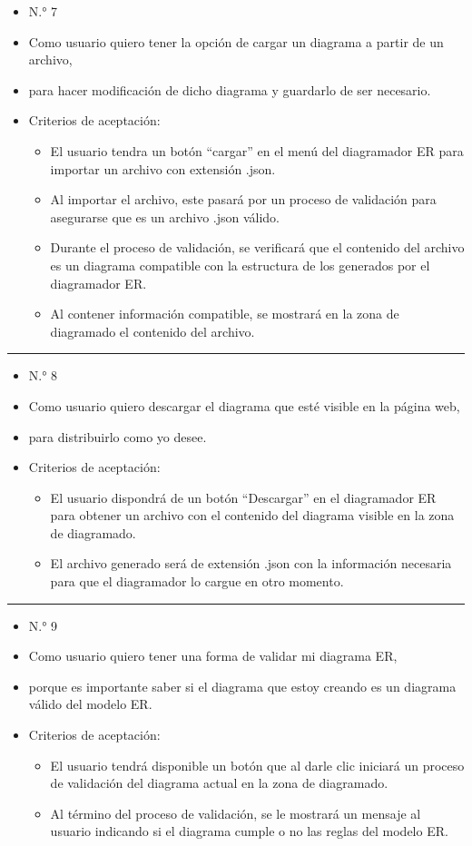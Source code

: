 \begin{itemize}
	\item N.° 7
	\item Como usuario quiero tener la opción de cargar un diagrama a partir de un archivo,
	\item para hacer modificación de dicho diagrama y guardarlo de ser necesario.
	\item Criterios de aceptación:
	\begin{itemize}
		\item El usuario tendra un botón ``cargar'' en el menú del diagramador ER para importar un archivo con extensión .json.
		\item Al importar el archivo, este pasará por un proceso de validación para asegurarse que es un archivo .json válido.
		\item Durante el proceso de validación, se verificará que el contenido del archivo es un diagrama compatible con la estructura de los generados por el diagramador ER.
		\item Al contener información compatible, se mostrará en la zona de diagramado el contenido del archivo.
	\end{itemize}
\end{itemize}
\noindent\rule{\textwidth}{1pt}
\begin{itemize}
	\item N.° 8
	\item Como usuario quiero descargar el diagrama que esté visible en la página web,
	\item para distribuirlo como yo desee.
	\item Criterios de aceptación:
	\begin{itemize}
		\item El usuario dispondrá de un botón ``Descargar'' en el diagramador ER para obtener un archivo con el contenido del diagrama visible en la zona de diagramado.
		\item El archivo generado será de extensión .json con la información necesaria para que el diagramador lo cargue en otro momento.
	\end{itemize}
\end{itemize}
\noindent\rule{\textwidth}{1pt}
\begin{itemize}
	\item N.° 9
	\item Como usuario quiero tener una forma de validar mi diagrama ER,
	\item porque es importante saber si el diagrama que estoy creando es un diagrama válido del modelo ER.
	\item Criterios de aceptación:
	\begin{itemize}
		\item El usuario tendrá disponible un botón que al darle clic iniciará un proceso de validación del diagrama actual en la zona de diagramado.
		\item Al término del proceso de validación, se le mostrará un mensaje al usuario indicando si el diagrama cumple o no las reglas del modelo ER.
	\end{itemize}
\end{itemize}

